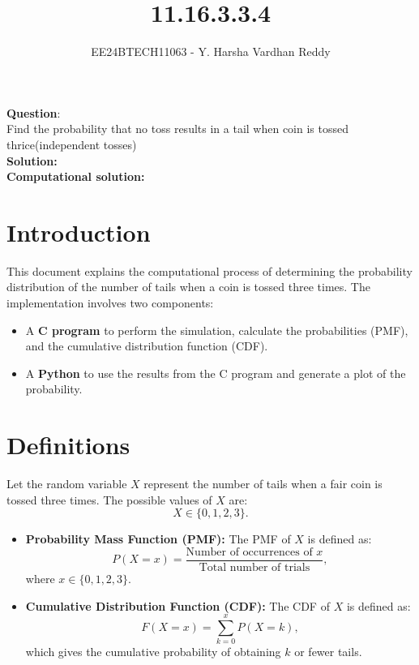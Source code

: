 \documentclass[journal]{IEEEtran}
\begin{document}
	
	
	\vspace{3cm}
	
	\title{11.16.3.3.4}
	\author{EE24BTECH11063 - Y. Harsha Vardhan Reddy }
	{\let\newpage\relax\maketitle}
	
	\renewcommand{\thefigure}{\theenumi}
	\renewcommand{\thetable}{\theenumi}
	\setlength{\intextsep}{10pt} %
	
	
	\renewcommand{\thetable}{\theenumi}
	
	
\textbf{Question}:\\
Find the probability that no toss results in a tail when coin is tossed thrice(independent tosses) \\
\textbf{Solution: }\\
\textbf{Computational solution: }\\

\section*{Introduction}
This document explains the computational process of determining the probability distribution of the number of tails when a coin is tossed three times. The implementation involves two components:
\begin{itemize}
    \item A \textbf{C program} to perform the simulation, calculate the probabilities (PMF), and the cumulative distribution function (CDF).
    \item A \textbf{Python} to use the results from the C program and generate a plot of the probability.
\end{itemize}

\section*{Definitions}
Let the random variable \( X \) represent the number of tails when a fair coin is tossed three times. The possible values of \( X \) are:
\[
X \in \{0, 1, 2, 3\}.
\]
\begin{itemize}
    \item \textbf{Probability Mass Function (PMF):} The PMF of \( X \) is defined as:
    \[
    P(X = x) = \frac{\text{Number of occurrences of } x}{\text{Total number of trials}},
    \]
    where \( x \in \{0, 1, 2, 3\} \).
    \item \textbf{Cumulative Distribution Function (CDF):} The CDF of \( X \) is defined as:
    \[
    F(X = x) = \sum_{k=0}^{x} P(X = k),
    \]
    which gives the cumulative probability of obtaining \( k \) or fewer tails.
\end{itemize}
\end{document}
